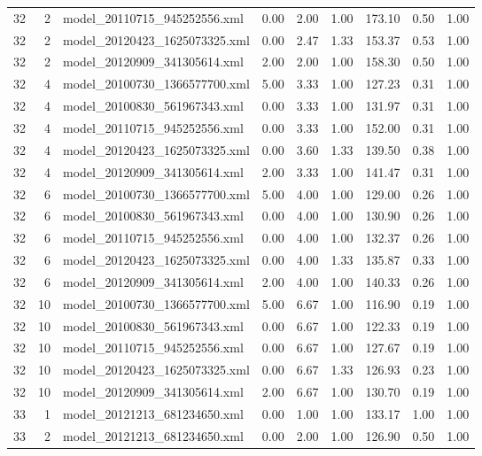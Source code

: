 \begin{table}[ht]
\begin{tabular}{rrlrrrrrr}
   32 &   2 & model\_20110715\_945252556.xml & 0.00 & 2.00 & 1.00 & 173.10 & 0.50 & 1.00 \\ 
   32 &   2 & model\_20120423\_1625073325.xml & 0.00 & 2.47 & 1.33 & 153.37 & 0.53 & 1.00 \\ 
   32 &   2 & model\_20120909\_341305614.xml & 2.00 & 2.00 & 1.00 & 158.30 & 0.50 & 1.00 \\ 
   32 &   4 & model\_20100730\_1366577700.xml & 5.00 & 3.33 & 1.00 & 127.23 & 0.31 & 1.00 \\ 
   32 &   4 & model\_20100830\_561967343.xml & 0.00 & 3.33 & 1.00 & 131.97 & 0.31 & 1.00 \\ 
   32 &   4 & model\_20110715\_945252556.xml & 0.00 & 3.33 & 1.00 & 152.00 & 0.31 & 1.00 \\ 
   32 &   4 & model\_20120423\_1625073325.xml & 0.00 & 3.60 & 1.33 & 139.50 & 0.38 & 1.00 \\ 
   32 &   4 & model\_20120909\_341305614.xml & 2.00 & 3.33 & 1.00 & 141.47 & 0.31 & 1.00 \\ 
   32 &   6 & model\_20100730\_1366577700.xml & 5.00 & 4.00 & 1.00 & 129.00 & 0.26 & 1.00 \\ 
   32 &   6 & model\_20100830\_561967343.xml & 0.00 & 4.00 & 1.00 & 130.90 & 0.26 & 1.00 \\ 
   32 &   6 & model\_20110715\_945252556.xml & 0.00 & 4.00 & 1.00 & 132.37 & 0.26 & 1.00 \\ 
   32 &   6 & model\_20120423\_1625073325.xml & 0.00 & 4.00 & 1.33 & 135.87 & 0.33 & 1.00 \\ 
   32 &   6 & model\_20120909\_341305614.xml & 2.00 & 4.00 & 1.00 & 140.33 & 0.26 & 1.00 \\ 
   32 &  10 & model\_20100730\_1366577700.xml & 5.00 & 6.67 & 1.00 & 116.90 & 0.19 & 1.00 \\ 
   32 &  10 & model\_20100830\_561967343.xml & 0.00 & 6.67 & 1.00 & 122.33 & 0.19 & 1.00 \\ 
   32 &  10 & model\_20110715\_945252556.xml & 0.00 & 6.67 & 1.00 & 127.67 & 0.19 & 1.00 \\ 
   32 &  10 & model\_20120423\_1625073325.xml & 0.00 & 6.67 & 1.33 & 126.93 & 0.23 & 1.00 \\ 
   32 &  10 & model\_20120909\_341305614.xml & 2.00 & 6.67 & 1.00 & 130.70 & 0.19 & 1.00 \\ 
   33 &   1 & model\_20121213\_681234650.xml & 0.00 & 1.00 & 1.00 & 133.17 & 1.00 & 1.00 \\ 
   33 &   2 & model\_20121213\_681234650.xml & 0.00 & 2.00 & 1.00 & 126.90 & 0.50 & 1.00 \\ 

\end{tabular}
\end{table}
